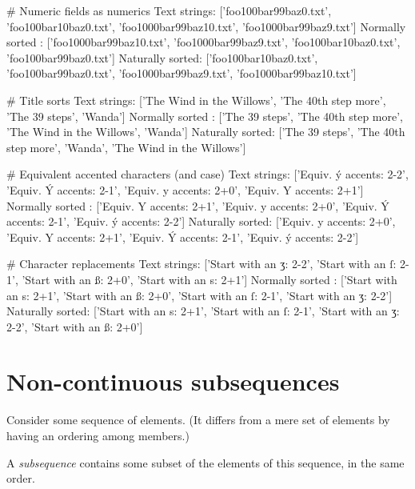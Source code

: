 
\begin{wideverbatim}

# Numeric fields as numerics
Text strings:
['foo100bar99baz0.txt',
 'foo100bar10baz0.txt',
 'foo1000bar99baz10.txt',
 'foo1000bar99baz9.txt']
Normally sorted :
['foo1000bar99baz10.txt',
 'foo1000bar99baz9.txt',
 'foo100bar10baz0.txt',
 'foo100bar99baz0.txt']
Naturally sorted:
['foo100bar10baz0.txt',
 'foo100bar99baz0.txt',
 'foo1000bar99baz9.txt',
 'foo1000bar99baz10.txt']

# Title sorts
Text strings:
['The Wind in the Willows',
 'The 40th step more',
 'The 39 steps',
 'Wanda']
Normally sorted :
['The 39 steps',
 'The 40th step more',
 'The Wind in the Willows',
 'Wanda']
Naturally sorted:
['The 39 steps',
 'The 40th step more',
 'Wanda',
 'The Wind in the Willows']

\end{wideverbatim}

\begin{wideverbatim}

# Equivalent accented characters (and case)
Text strings:
['Equiv. ý accents: 2-2',
 'Equiv. Ý accents: 2-1',
 'Equiv. y accents: 2+0',
 'Equiv. Y accents: 2+1']
Normally sorted :
['Equiv. Y accents: 2+1',
 'Equiv. y accents: 2+0',
 'Equiv. Ý accents: 2-1',
 'Equiv. ý accents: 2-2']
Naturally sorted:
['Equiv. y accents: 2+0',
 'Equiv. Y accents: 2+1',
 'Equiv. Ý accents: 2-1',
 'Equiv. ý accents: 2-2']

# Character replacements
Text strings:
['Start with an ʒ: 2-2',
 'Start with an ſ: 2-1',
 'Start with an ß: 2+0',
 'Start with an s: 2+1']
Normally sorted :
['Start with an s: 2+1',
 'Start with an ß: 2+0',
 'Start with an ſ: 2-1',
 'Start with an ʒ: 2-2']
Naturally sorted:
['Start with an s: 2+1',
 'Start with an ſ: 2-1',
 'Start with an ʒ: 2-2',
 'Start with an ß: 2+0']

\end{wideverbatim}

\pagebreak{}
\section*{Non-continuous subsequences}

Consider some sequence of elements. (It differs from a mere set of
elements by having an ordering among members.)

A \emph{subsequence} contains some subset of the elements of this
sequence, in the same order.

